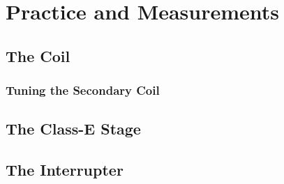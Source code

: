 \setchapterpreamble[u]{\margintoc}

\chapter{Practice and Measurements} %

\section{The Coil}

\subsection{Tuning the Secondary Coil}

\section{The Class-E Stage}



\section{The Interrupter}